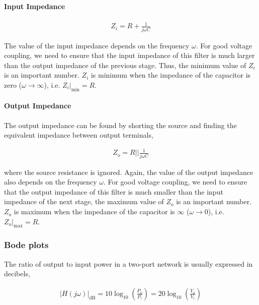 \paragraph*{\textbf{Input Impedance}}

\begin{align*}
    Z_i = R+\frac{1}{j\omega C}
\end{align*}

The value of the input impedance depends on the frequency $\omega$. For good voltage coupling, we need to ensure that the input impedance of this filter is much larger than the output impedance of the previous stage. Thus, the minimum value of $Z_i$ is an important number. $Z_i$ is minimum when the impedance of the capacitor is zero ($\omega \rightarrow \infty$), i.e. $Z_i\big|_\text{min} = R$. \\

\paragraph*{\textbf{Output Impedance}}
The output impedance can be found by shorting the source and finding the equivalent impedance between output terminals,

\begin{align*}
    Z_o = R \bigg|\bigg|  \frac{1}{j\omega C}
\end{align*}

where the source resistance is ignored. Again, the value of the output impedance also depends on the frequency $\omega$. For good voltage coupling, we need to ensure that the output impedance of this filter is much smaller than the input impedance of the next stage, the maximum value of $Z_o$ is an important number. $Z_o$ is maximum when the impedance of the capacitor is $\infty$ ($\omega \rightarrow 0$), i.e. $Z_o\big|_\text{max} = R$.

\subsubsection*{\textbf{Bode plots}}
The ratio of output to input power in a two-port network is usually expressed in decibels,

\begin{align*}
    |H(j\omega)|_\text{dB} = 10\log_{10}\left(\frac{P_o}{P_i}\right) = 20\log_{10}\left(\frac{V_o}{V_i}\right)
\end{align*}

